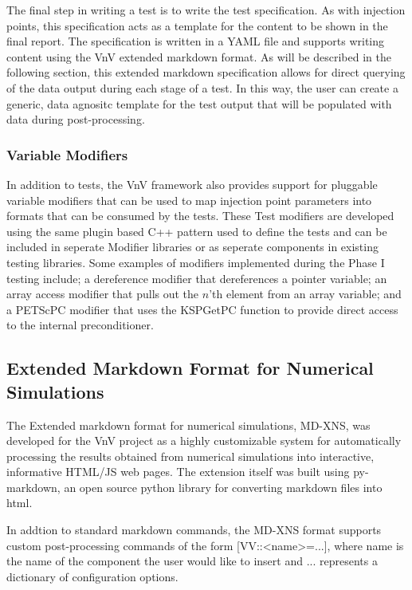 The final step in writing a test is to write the test specification. As with injection points, this specification acts as a template for the 
content to be shown in the final report. The specification is written in a YAML file and supports writing content using the VnV extended markdown format. As will be described 
in the following section, this extended markdown specification allows for direct querying of the data output during each stage of a \VV test. In this way, the user can 
create a generic, data agnositc template for the \VV test output that will be populated with data during post-processing. 

\subsubsection{Variable Modifiers}

In addition to tests, the VnV framework also provides support for pluggable variable modifiers that can be used to 
map injection point parameters into formats that can be consumed by the tests. These Test modifiers are developed using 
the same plugin based C++ pattern used to define the tests and can be included in seperate Modifier libraries or as seperate 
components in existing testing libraries. Some examples of modifiers implemented during the Phase I testing include; a dereference modifier
that dereferences a pointer variable; an array access modifier that pulls out the $n$'th element from an array variable; and a PETScPC modifier that
uses the KSPGetPC function to provide direct access to the internal preconditioner. 


\subsection{Extended Markdown Format for Numerical Simulations} 

The Extended markdown format for numerical simulations, MD-XNS,  was developed for the VnV project as a highly customizable system for automatically processing the results obtained from numerical simulations into interactive, informative HTML/JS web pages. The extension itself was built using py-markdown, an open source python library for converting markdown files into html.

In addtion to standard markdown commands, the MD-XNS format supports custom post-processing commands of the form [VV::<name>={...}], where name is the name of the component the user would like to insert and {...} represents a dictionary of configuration options. 

